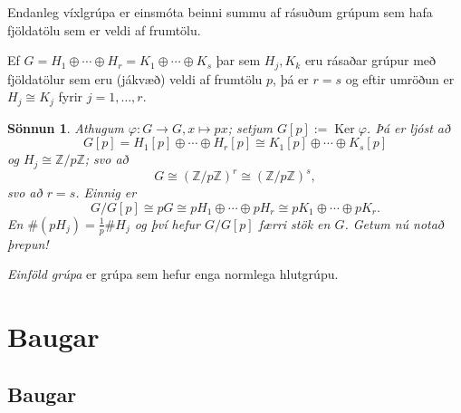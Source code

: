 \documentclass[a4paper,icelandic,11pt]{book}
\theoremstyle{plain}
\newtheorem*{sonnun}{Sönnun}
\newcommand{\Z}{\mathbb{Z}}
\DeclareMathOperator{\Ker}{Ker} %
\begin{document}
\begin{fylgisetn}
  Endanleg víxlgrúpa er einsmóta beinni summu af rásuðum grúpum sem hafa
  fjöldatölu sem er veldi af frumtölu.
\end{fylgisetn}
\begin{hjalparsetn}
  Ef $G = H_1\oplus\cdots\oplus H_r = K_1\oplus\cdots\oplus K_s$ þar sem
  $H_j,K_k$ eru rásaðar grúpur með fjöldatölur sem eru (jákvæð) veldi af
  frumtölu $p$, þá er $r = s$ og eftir umröðun er $H_j\cong K_j$ fyrir
  $j = 1,\dots,r$.
\end{hjalparsetn}
\begin{sonnun}
  Athugum $\varphi:G\to G, x\mapsto px$; setjum $G[p]:=\Ker\varphi$. Þá er ljóst
  að 
  \begin{equation*}
  G[p] = H_1[p]\oplus\cdots\oplus H_r[p]\cong K_1[p]\oplus\cdots\oplus K_s[p]
  \end{equation*}
  og $H_j\cong \Z/p\Z$; svo að 
  \[
  G 
  \cong
  \left( \Z/p\Z \right)^r
  \cong
  \left( \Z/p\Z \right)^s,
  \]
  svo að $r = s$. Einnig er 
  \begin{equation*}
  G/G[p]
  \cong pG
  \cong pH_1\oplus\cdots\oplus pH_r
  \cong pK_1\oplus\cdots\oplus pK_r.
  \end{equation*}
  En $\#(pH_j) = \frac{1}{p}\#H_j$ og því hefur $G/G[p]$ færri stök en
  $G$. Getum nú notað þrepun!
\end{sonnun}
\begin{skilgr}
  \emph{Einföld grúpa} er grúpa sem
  hefur enga normlega hlutgrúpu.
\end{skilgr}

\part{Baugar}
\chapter{Baugar}
\end{document}
